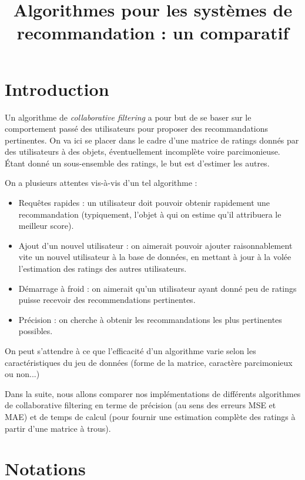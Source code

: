 \documentclass[11pt, openany, a4paper]{article}
\begin{document}
\title{Algorithmes pour les systèmes de recommandation : un comparatif}
\date{}
\maketitle
\section*{Introduction}

Un algorithme de \emph{collaborative filtering} a pour but de se baser sur le comportement passé des utilisateurs pour proposer des recommandations pertinentes. On va ici se placer dans le cadre d'une matrice de ratings donnés par des utilisateurs à des objets, éventuellement incomplète voire parcimonieuse. Étant donné un sous-ensemble des ratings, le but est d'estimer les autres.

On a plusieurs attentes vis-à-vis d'un tel algorithme :
\begin{itemize}
	\item{Requêtes rapides : un utilisateur doit pouvoir obtenir rapidement une recommandation (typiquement, l'objet à qui on estime qu'il attribuera le meilleur score).}
	\item{Ajout d'un nouvel utilisateur : on aimerait pouvoir ajouter raisonnablement vite un nouvel utilisateur à la base de données, en mettant à jour à la volée l'estimation des ratings des autres utilisateurs.}
	\item{Démarrage à froid : on aimerait qu'un utilisateur ayant donné peu de ratings puisse recevoir des recommendations pertinentes.}
	\item{Précision : on cherche à obtenir les recommandations les plus pertinentes possibles.}
\end{itemize}

On peut s'attendre à ce que l'efficacité d'un algorithme varie selon les caractéristiques du jeu de données (forme de la matrice, caractère parcimonieux ou non...)

Dans la suite, nous allons comparer nos implémentations de différents algorithmes de collaborative filtering en terme de précision (au sens des erreurs MSE et MAE) et de temps de calcul (pour fournir une estimation complète des ratings à partir d'une matrice à trous).


\tableofcontents

\section*{Notations}
\end{document}
